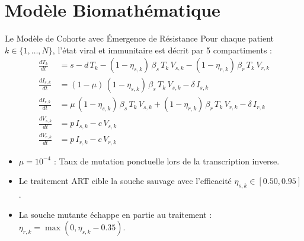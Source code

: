 \documentclass[aspectratio=169, 10pt, french]{beamer}
\begin{document}
\section{Modèle Biomathématique}
\begin{frame}{Le Modèle de Cohorte avec Émergence de Résistance}
    Pour chaque patient $k \in \{1, \dots, N\}$, l'état viral et immunitaire est décrit par 5 compartiments :
    \begin{align*}
        \frac{dT_k}{dt} &= s - d\,T_k - (1 - \eta_{s,k})\,\beta_s\,T_k\,V_{s,k} - (1 - \eta_{r,k})\,\beta_r\,T_k\,V_{r,k} \\
        \frac{dI_{s,k}}{dt} &= (1 - \mu)\,(1 - \eta_{s,k})\,\beta_s\,T_k\,V_{s,k} - \delta\,I_{s,k} \\
        \frac{dI_{r,k}}{dt} &= \mu\,(1 - \eta_{s,k})\,\beta_s\,T_k\,V_{s,k} + (1 - \eta_{r,k})\,\beta_r\,T_k\,V_{r,k} - \delta\,I_{r,k} \\
        \frac{dV_{s,k}}{dt} &= p\,I_{s,k} - c\,V_{s,k} \\
        \frac{dV_{r,k}}{dt} &= p\,I_{r,k} - c\,V_{r,k}
    \end{align*}

    \begin{cadreclinique}
        \footnotesize
        \begin{itemize}
            \item $\mu = 10^{-4}$ : Taux de mutation ponctuelle lors de la transcription inverse.
            \item Le traitement ART cible la souche sauvage avec l'efficacité $\eta_{s,k} \in [0.50, 0.95]$.
            \item La souche mutante échappe en partie au traitement : $\eta_{r,k} = \max(0, \eta_{s,k} - 0.35)$.
        \end{itemize}
    \end{cadreclinique}
\end{frame}

\end{document}

